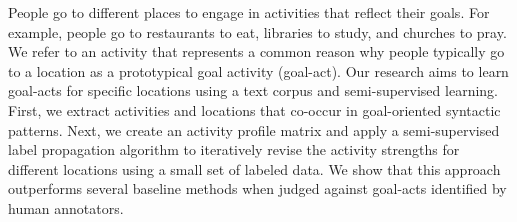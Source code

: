 People go to different places to engage in activities that reflect their goals. For example, people go to restaurants to eat, libraries to study, and churches to pray. We refer to an activity that represents a common reason why people typically go to a location as a prototypical goal activity (goal-act).  Our research aims to learn goal-acts for specific locations using a text corpus and semi-supervised learning. First, we extract activities and locations that co-occur in goal-oriented syntactic patterns. Next, we create an activity profile matrix and apply a semi-supervised label propagation algorithm to iteratively revise the activity strengths for different locations using a small set of labeled data. We show that this approach outperforms several baseline methods when judged against goal-acts identified by human annotators.
